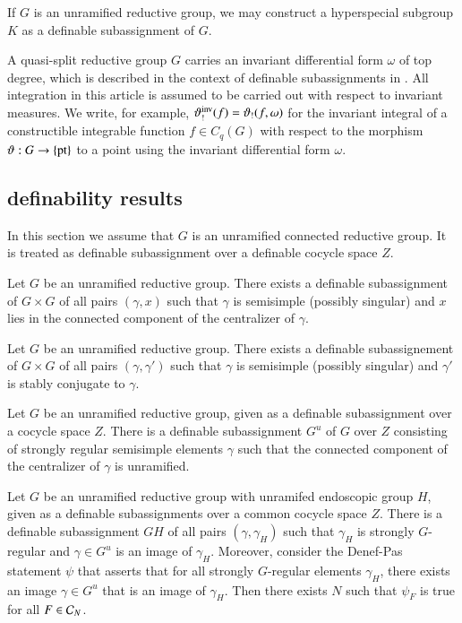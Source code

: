 If $G$ is an unramified reductive group, we may construct a hyperspecial subgroup $K$ as a definable subassignment of $G$.

A quasi-split reductive group $G$ carries an invariant differential form $\omega$ of top degree, which is described in the
context of definable subassignments in \cite{gordon}.
All integration in this article is assumed to be carried out with respect to invariant measures.  We write, for example,
$\vartheta_!^{\operatorname{inv}}(f) = \vartheta_!(f,\omega)$ for the invariant integral of a constructible integrable function $f\in C_q(G)$ with respect to the
morphism $\vartheta:G\to\{{\operatorname{pt}}\}$ to a point using the invariant differential form $\omega$.

\subsection{definability results}\label{sec:definability}

In this section we assume that $G$ is an unramified connected reductive group.  It is treated  as definable subassignment
over a definable cocycle space $Z$.

\begin{lemma}  Let $G$ be an unramified reductive group.  There exists a definable subassignment of $G\times G$ of all pairs
$(\gamma,x)$ such that $\gamma$ is semisimple (possibly singular) and $x$ lies in the connected component of the centralizer of $\gamma$.
\end{lemma}

\begin{lemma} Let $G$ be an unramified reductive group.  There exists a definable subassignement of $G\times G$ of all pairs
$(\gamma,\gamma')$ such that $\gamma$ is semisimple (possibly singular) and $\gamma'$ is stably conjugate to $\gamma$.
\end{lemma}

\begin{lemma} Let $G$ be an unramified reductive group, given as a definable subassignment over a cocycle space $Z$.
There is a definable subassignment $G^u$ of $G$ over $Z$ 
consisting of strongly regular semisimple elements $\gamma$ such that
the connected component of the centralizer of $\gamma$ is unramified. 
\end{lemma}

\begin{lemma} Let $G$ be an unramified reductive group with unramifed endoscopic group $H$, given as a definable subassignments over a common cocycle space $Z$.
There is a definable subassignment $GH$ of all pairs $(\gamma,\gamma_H)$ such that $\gamma_H$ is strongly $G$-regular and $\gamma\in G^u$ is an image of $\gamma_H$.
Moreover,
consider the Denef-Pas statement $\psi$ that asserts that for all strongly $G$-regular elements $\gamma_H$, there exists an image $\gamma\in G^u$ that is an image of $\gamma_H$.
Then there exists $N$ such that $\psi_F$ is true for all $F\in\mathcal C_N$.
\end{lemma}

